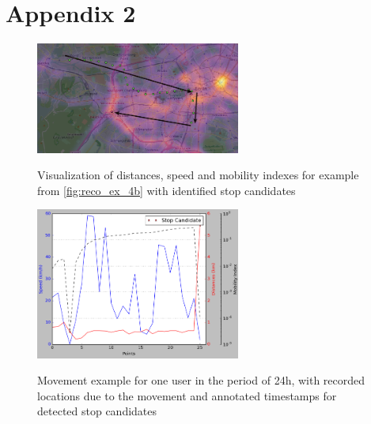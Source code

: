 \chapter{Appendix 2}
\label{appendix:add_example_2}

\begin{figure}[!ht]
	\centering
	\includegraphics[width=0.6\textwidth]{images/reco_example_4a.png}\\
	\caption{ Visualization of distances, speed and mobility indexes for example from \autoref{fig:reco_ex_4b} with identified stop candidates }
	\label{fig:reco_ex_4a}
\end{figure} 
\begin{figure}[!ht]
	\centering
	\includegraphics[width=0.6\textwidth]{images/reco_example_4b.png}\\
	\caption{ Movement example for one user in the period of 24h, with recorded locations due to the movement and annotated timestamps for detected stop candidates }
	\label{fig:reco_ex_4b}
\end{figure}
